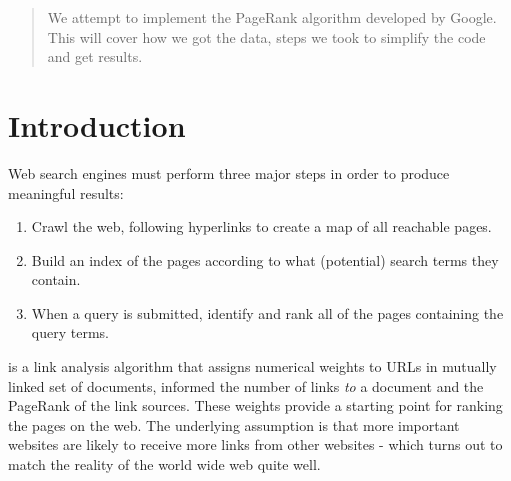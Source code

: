 \begin{abstract} 
We attempt to implement the PageRank algorithm developed by Google. This will 
cover how we got the data, steps we took to simplify the code and get results. 
\end{abstract}

\section{Introduction}
Web search engines must perform three major steps in order to produce meaningful
results:
\begin{enumerate}
\item Crawl the web, following hyperlinks to create a map of all reachable pages.
\item Build an index of the pages according to what (potential) search terms they contain.
\item When a query is submitted, identify and rank all of the pages containing the query terms.
\end{enumerate}
 is a link analysis algorithm that assigns numerical weights 
to URLs in mutually linked set of documents, informed the number of links 
\emph{to} a document and the PageRank of the link sources.  These weights provide 
a starting point for ranking the pages on the web.
The underlying assumption is that more important websites are likely to receive 
more links from other websites - which turns out to match the reality
of the world wide web quite well.